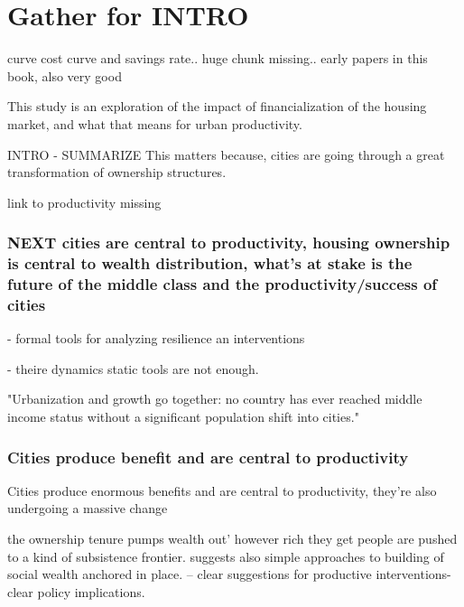 \chapter{Gather for INTRO}


\cite{spenceUrbanizationGrowth2009} 
curve cost curve and savings rate.. huge chunk missing..
early papers in this book, also very good


This study is an exploration of the impact of financialization of the housing market, and what that means for urban productivity.

INTRO - SUMMARIZE 
This matters because, %
cities are going through a great transformation of ownership structures. 

link to productivity missing


\subsection{NEXT cities are central to productivity, housing ownership is central to wealth distribution, what's at stake is the future of the middle class and the productivity/success of cities}
- formal tools for analyzing resilience an interventions

- theire dynamics static tools are not enough. 

"Urbanization and growth go together: no country has ever reached middle income status without a significant population shift into cities." \cite{annezUrbanizationGrowthSetting2009} %

\subsection{Cities produce benefit and are central to productivity}
Cities produce enormous benefits and are central to productivity, they're also undergoing a massive change

the ownership tenure pumps wealth out'
however rich they get people are pushed to a kind of subsistence frontier. 
suggests also simple approaches to building of social wealth anchored in place. -- clear suggestions for productive interventions- clear policy implications. 

